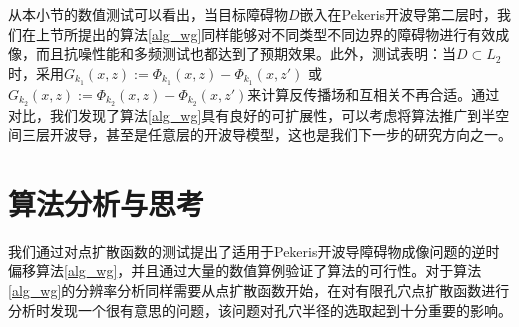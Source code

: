 %
\begin{remark}
	从本小节的数值测试可以看出，当目标障碍物$D$嵌入在Pekeris开波导第二层时，我们在上节所提出的算法\ref{alg_wg}同样能够对不同类型不同边界的障碍物进行有效成像，而且抗噪性能和多频测试也都达到了预期效果。此外，测试表明：当$D\subset L_2$时，采用$G_{k_1}(x,z):=\Phi_{k_1}(x,z)-\Phi_{k_1}(x,z')$
	或$G_{k_2}(x,z):=\Phi_{k_2}(x,z)-\Phi_{k_2}(x,z')$来计算反传播场和互相关不再合适。通过对比，我们发现了算法\ref{alg_wg}具有良好的可扩展性，可以考虑将算法推广到半空间三层开波导，甚至是任意层的开波导模型，这也是我们下一步的研究方向之一。
\end{remark}

\section{算法分析与思考}
我们通过对点扩散函数的测试提出了适用于Pekeris开波导障碍物成像问题的逆时偏移算法\ref{alg_wg}，并且通过大量的数值算例验证了算法的可行性。对于算法\ref{alg_wg}的分辨率分析同样需要从点扩散函数开始，在对有限孔穴点扩散函数进行分析时发现一个很有意思的问题，该问题对孔穴半径的选取起到十分重要的影响。

